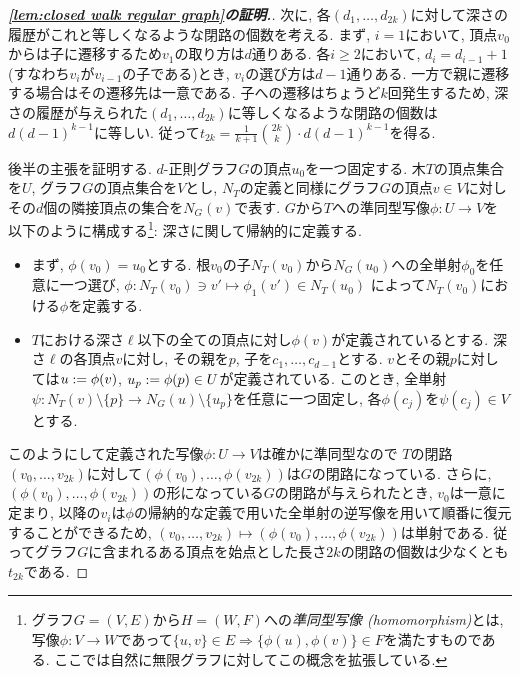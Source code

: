 \begin{proof}[\textbf{\cref{lem:closed walk regular graph}の証明.}]
    次に, 各$(d_1,\dots,d_{2k})$に対して深さの履歴がこれと等しくなるような閉路の個数を考える.
    まず, $i=1$において, 頂点$v_0$からは子に遷移するため$v_1$の取り方は$d$通りある.
    各$i\ge 2$において, $d_i=d_{i-1}+1$ (すなわち$v_i$が$v_{i-1}$の子である)とき, $v_i$の選び方は$d-1$通りある.
    一方で親に遷移する場合はその遷移先は一意である.
    子への遷移はちょうど$k$回発生するため, 深さの履歴が与えられた$(d_1,\dots,d_{2k})$に等しくなるような閉路の個数は$d(d-1)^{k-1}$に等しい.
    従って$t_{2k} = \frac{1}{k+1}\binom{2k}{k} \cdot d(d-1)^{k-1}$を得る.

    後半の主張を証明する.
    $d$-正則グラフ$G$の頂点$u_0$を一つ固定する.
    木$T$の頂点集合を$U$, グラフ$G$の頂点集合を$V$とし,
    $N_T$の定義と同様にグラフ$G$の頂点$v \in V$に対しその$d$個の隣接頂点の集合を$N_G(v)$で表す.
    $G$から$T$への準同型写像$\phi \colon U \to V$を以下のように構成する\footnote{グラフ$G=(V,E)$から$H=(W,F)$への\emph{準同型写像 (homomorphism)}とは, 写像$\phi\colon V\to W$であって$\{u,v\}\in E\Rightarrow \{\phi(u),\phi(v)\}\in F$を満たすものである. ここでは自然に無限グラフに対してこの概念を拡張している.}:
    深さに関して帰納的に定義する.
    \begin{itemize}
        \item まず, $\phi(v_0) = u_0$とする.
              根$v_0$の子$N_T(v_0)$から$N_G(u_0)$への全単射$\phi_0$を任意に一つ選び,
              $\phi\colon N_T(v_0) \ni v' \mapsto \phi_1(v') \in N_T(u_0)$
              によって$N_T(v_0)$における$\phi$を定義する.
        \item $T$における深さ$\ell$以下の全ての頂点に対し$\phi(v)$が定義されているとする. 深さ$\ell$の各頂点$v$に対し, その親を$p$, 子を$c_1,\dots,c_{d-1}$とする. $v$とその親$p$に対しては$u\mathrel{:=} \phi(v)$, $u_p\mathrel{:=} \phi(p)\in U$が定義されている. このとき, 全単射$\psi\colon N_T(v)\setminus \{p\} \to N_G(u)\setminus\{u_p\}$を任意に一つ固定し, 各$\phi(c_j)$を$\psi(c_j)\in V$とする.
    \end{itemize}
    このようにして定義された写像$\phi\colon U \to V$は確かに準同型なので
    $T$の閉路$(v_0,\dots,v_{2k})$に対して$(\phi(v_0),\dots,\phi(v_{2k}))$は$G$の閉路になっている.
    さらに, $(\phi(v_0),\dots,\phi(v_{2k}))$の形になっている$G$の閉路が与えられたとき, $v_0$は一意に定まり, 以降の$v_i$は$\phi$の帰納的な定義で用いた全単射の逆写像を用いて順番に復元することができるため, $(v_0,\dots,v_{2k}) \mapsto (\phi(v_0),\dots,\phi(v_{2k}))$は単射である.
    従ってグラフ$G$に含まれるある頂点を始点とした長さ$2k$の閉路の個数は少なくとも$t_{2k}$である.
\end{proof}


